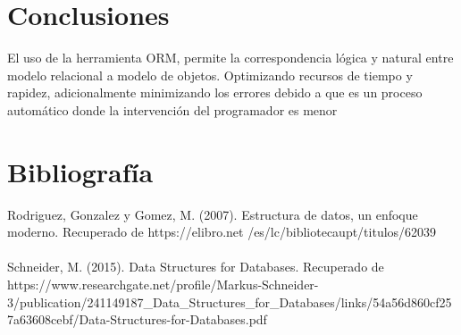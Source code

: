 \documentclass{article}
\begin{document}
\section{Conclusiones}
El uso de la herramienta ORM, permite la correspondencia lógica y natural entre modelo relacional a modelo de objetos. Optimizando recursos de tiempo y rapidez, adicionalmente minimizando los errores debido a que es un proceso automático donde la intervención del programador es menor

\section{Bibliografía}
Rodriguez, Gonzalez y Gomez, M. (2007). Estructura de datos, un enfoque moderno. Recuperado de https://elibro.net /es/lc/bibliotecaupt/titulos/62039
\\\\Schneider, M. (2015). Data Structures for Databases. Recuperado de https://www.researchgate.net/profile/Markus-Schneider-3/publication/241149187_Data_Structures_for_Databases/links/54a56d860cf257a63608cebf/Data-Structures-for-Databases.pdf





\end{document}
